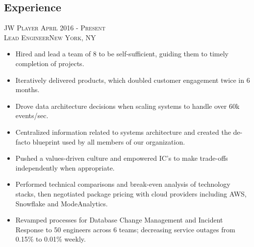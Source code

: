 \documentclass[oneside, final]{scrartcl}
\begin{document}
\begin{center}
\section{Experience}
\textsc{JW Player \hfill April 2016 - Present\\}
\textsc{Lead Engineer\hfill New York, NY\\}
\begin{itemize}
    \vspace{-4pt}
	\setlength{\itemsep}{1pt}
	\setlength{\parskip}{0pt}
	\setlength{\parsep}{0pt}
	\setlength{\leftmargin}{-5mm}
	\item Hired and lead a team of 8 to be self-sufficient, guiding them to timely completion of projects.
	\item Iteratively delivered products, which doubled customer engagement twice in 6 months.
	\item Drove data architecture decisions when scaling systems to handle over 60k events/sec.
	\item Centralized information related to systems architecture and created the de-facto blueprint used by all members of our organization.
	\item Pushed a values-driven culture and empowered IC's to make trade-offs independently when appropriate. 
	\item Performed technical comparisons and break-even analysis of technology stacks, then negotiated package pricing with cloud providers including AWS, Snowflake and ModeAnalytics.
	\item Revamped processes for Database Change Management and Incident Response to 50 engineers across 6 teams; decreasing service outages from 0.15\% to 0.01\% weekly.
\end{itemize}


\end{center}
\end{document}
